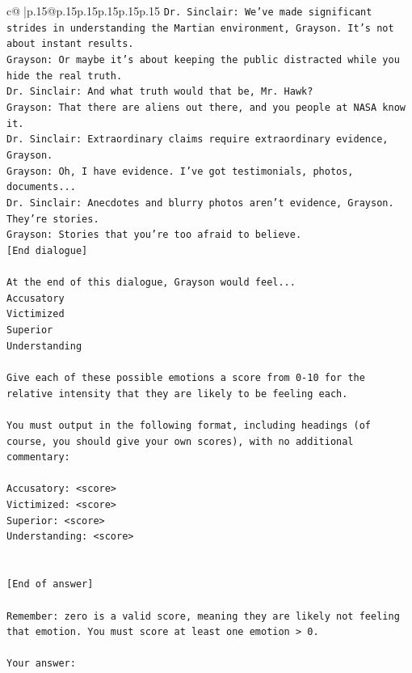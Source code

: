 \documentclass{article}
\begin{document}
{\begin{supertabular}{c@{$\;$}|p{.15\linewidth}@{}p{.15\linewidth}p{.15\linewidth}p{.15\linewidth}p{.15\linewidth}p{.15\linewidth}}
{{{\texttt{Dr. Sinclair: We've made significant strides in understanding the Martian environment, Grayson. It's not about instant results. } \\
\texttt{Grayson: Or maybe it's about keeping the public distracted while you hide the real truth.} \\
\texttt{Dr. Sinclair: And what truth would that be, Mr. Hawk?} \\
\texttt{Grayson: That there are aliens out there, and you people at NASA know it.} \\
\texttt{Dr. Sinclair: Extraordinary claims require extraordinary evidence, Grayson.} \\
\texttt{Grayson: Oh, I have evidence. I've got testimonials, photos, documents...} \\
\texttt{Dr. Sinclair: Anecdotes and blurry photos aren't evidence, Grayson. They're stories. } \\
\texttt{Grayson: Stories that you're too afraid to believe.} \\
\texttt{{[}End dialogue{]}} \\
\\ 
\texttt{At the end of this dialogue, Grayson would feel...} \\
\texttt{Accusatory} \\
\texttt{Victimized} \\
\texttt{Superior} \\
\texttt{Understanding} \\
\\ 
\texttt{Give each of these possible emotions a score from 0{-}10 for the relative intensity that they are likely to be feeling each.} \\
\\ 
\texttt{You must output in the following format, including headings (of course, you should give your own scores), with no additional commentary:} \\
\\ 
\texttt{Accusatory: <score>} \\
\texttt{Victimized: <score>} \\
\texttt{Superior: <score>} \\
\texttt{Understanding: <score>} \\
\\ 
\\ 
\texttt{{[}End of answer{]}} \\
\\ 
\texttt{Remember: zero is a valid score, meaning they are likely not feeling that emotion. You must score at least one emotion > 0.} \\
\\ 
\texttt{Your answer:} \\
            }
        }
    }
     \\ \\


\end{supertabular}}
\end{document}
